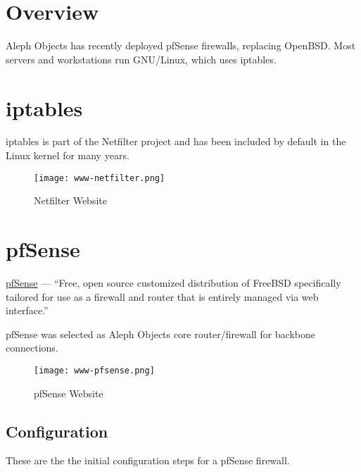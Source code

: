 %
%
%
%
%

\section{Overview}
Aleph Objects has recently deployed pfSense firewalls, replacing OpenBSD.
Most servers and workstations run GNU/Linux, which uses iptables.


\section{iptables}
iptables is part of the Netfilter project and has been included by default in
the Linux kernel for many years.

\begin{figure}[h!]
\texttt{[image: www-netfilter.png]}
 \caption{Netfilter Website}
 \label{fig:www-netfilter}
\end{figure}


\section{pfSense}
\href{https://www.pfsense.org/}{pfSense} --- ``Free, open source customized
distribution of FreeBSD specifically tailored for use as a firewall and router
that is entirely managed via web interface.''

pfSense was selected as Aleph Objects core router/firewall for backbone
connections.

\begin{figure}[h!]
\texttt{[image: www-pfsense.png]}
 \caption{pfSense Website}
 \label{fig:www-pfsense}
\end{figure}

\subsection{Configuration}

These are the the initial configuration steps for a pfSense firewall.

